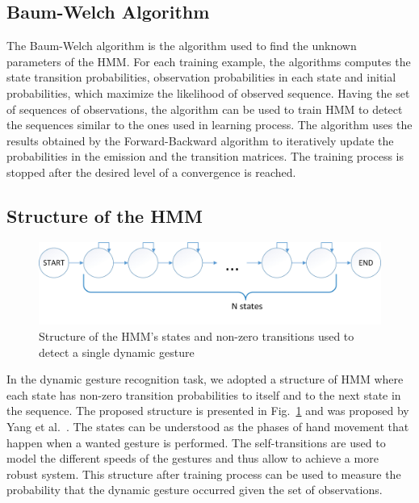 \subsection{Baum-Welch Algorithm}

The Baum-Welch algorithm is the algorithm used to find the unknown parameters of the HMM.
For each training example, the algorithms computes the state transition probabilities, observation probabilities in each state and initial probabilities, which maximize the likelihood of observed sequence.
Having the set of sequences of observations, the algorithm can be used to train HMM to detect the sequences similar to the ones used in learning process.
The algorithm uses the results obtained by the Forward-Backward algorithm to iteratively update the probabilities in the emission and the transition matrices.
The training process is stopped after the desired level of a convergence is reached.


\subsection{Structure of the HMM}

\begin{figure}[htbp!]
\centering
 \includegraphics[width=1\columnwidth]{figures/HMMSingle.jpg}
 \caption{Structure of the HMM's states and non-zero transitions used to detect a single dynamic gesture}
 \label{singlehmm}
\end{figure}

In the dynamic gesture recognition task, we adopted a structure of HMM where each state has non-zero transition probabilities to itself and to the next state in the sequence.
The proposed structure is presented in Fig.~\ref{singlehmm} and was proposed by Yang et al.~\cite{hmm}.
The states can be understood as the phases of hand movement that happen when a wanted gesture is performed.
The self-transitions are used to model the different speeds of the gestures and thus allow to achieve a more robust system.
This structure after training process can be used to measure the probability that the dynamic gesture occurred given the set of observations.



